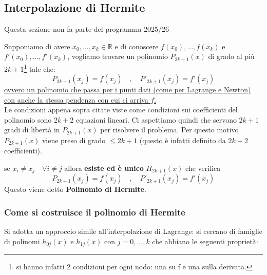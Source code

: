 \documentclass[12pt,a4paper,]{report}
\begin{document}
\subsection{Interpolazione di Hermite}
\begin{nota}
    Questa sezione non fa parte del programma 2025/26
\end{nota}
\noindent
Supponiamo di avere $x_0,...,x_k\in\mathbb{R}$ e di conoscere $f(x_0),...,f(x_k)$ e $f'(x_0),...,f'(x_k)$, vogliamo trovare un polinomio $P_{2k+1}(x)$ di grado al più $2k+1$\footnote{si hanno infatti 2 condizioni per ogni nodo: una su f e una sulla derivata.} tale che:
\[
P_{2k+1}(x_j) = f(x_j)\quad ,\quad P'_{2k+1}(x_j) = f'(x_j)
\]
\uline{ovvero un polinomio che passa per i punti dati (come per Lagrange e Newton) con anche la stessa pendenza con cui ci arriva $f$.}\\
Le condizioni appena sopra citate viste come condizioni sui coefficienti del polinomio sono $2k+2$ equazioni lineari. 
Ci aspettiamo quindi che servono $2k+1$ gradi di libertà in $P_{2k+1}(x)$ per risolvere il problema. 
Per questo motivo $P_{2k+1}(x)$ viene preso di grado $\leq 2k+1$ (questo è infatti definito da $2k+2$ coefficienti).
\begin{teorema}
    se $x_i\neq x_j \quad \forall i\neq j$ allora \textbf{esiste ed è unico} $H_{2k+1}(x)$ che verifica
    \[
    P_{2k+1}(x_j) = f(x_j)\quad ,\quad P'_{2k+1}(x_j) = f'(x_j)
    \]
    Questo viene detto \textbf{Polinomio di Hermite}.
\end{teorema}
\subsubsection{Come si costruisce il polinomio di Hermite}
Si adotta un approccio simile all'interpolazione di Lagrange: si cercano di famiglie di polinomi $h_{0j}(x)$ e $h_{1j}(x)$ con $j=0,...,k$ che abbiano le seguenti proprietà:
\end{document}
